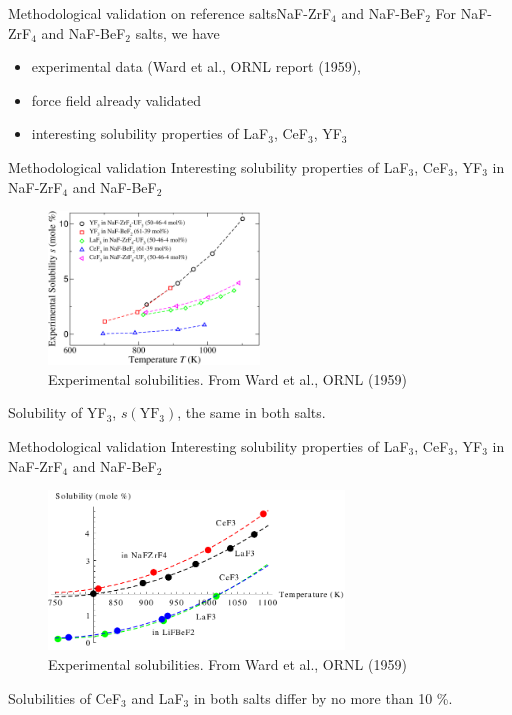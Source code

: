 \documentclass{beamer}
\begin{document}
\begin{frame}{Methodological validation on reference salts}{NaF-ZrF$_4$ and NaF-BeF$_2$}
    For NaF-ZrF$_4$ and NaF-BeF$_2$ salts, we have
    \begin{itemize}
        \item experimental data (Ward et al., ORNL report (1959),
        \item force field already validated
        \item interesting solubility properties of LaF$_3$, CeF$_3$, YF$_3$
    \end{itemize}
\end{frame}

\begin{frame}{Methodological validation}
    Interesting solubility properties of LaF$_3$, CeF$_3$, YF$_3$ in NaF-ZrF$_4$ and NaF-BeF$_2$
    \begin{figure}
        \includegraphics[width=0.5\textwidth]{ward_et_al_solubilities}
        \caption{Experimental solubilities. From Ward et al., ORNL (1959)}
    \end{figure}
    Solubility of YF$_3$, $s(\text{YF}_3)$, the same in both salts.
\end{frame}

\begin{frame}{Methodological validation}
    Interesting solubility properties of LaF$_3$, CeF$_3$, YF$_3$ in NaF-ZrF$_4$ and NaF-BeF$_2$
    \begin{figure}
        \includegraphics[width=0.7\textwidth]{CeF3vsLaF3}
        \caption{Experimental solubilities. From Ward et al., ORNL (1959)}
    \end{figure}
    Solubilities of CeF$_3$ and LaF$_3$ in both salts differ by no more than 10 \%.
\end{frame}
\end{document}
